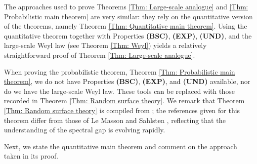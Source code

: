 \documentclass[11pt,twoside,reqno]{amsart} \usepackage{a4wide} \usepackage[T1]{fontenc} \usepackage[utf8]{inputenc} \usepackage{soul}  \usepackage{amsmath} \usepackage{amsfonts} \usepackage{amssymb} \usepackage{mathtools} \usepackage{amsthm} \usepackage{xcolor} \usepackage{graphicx} \usepackage{hyperref} \usepackage{standalone} \usepackage{esint} \usepackage{comment} \usepackage[left=2.3cm,top=3cm,right=2.3cm]{geometry} \usepackage{bm} \usepackage{svg} \usepackage{float} \numberwithin{equation}{section} \theoremstyle{plain} \newtheorem{thm}{Theorem}[section] \newtheorem{theorem}[thm]{Theorem} \newtheorem*{theorem*}{Theorem}\newtheorem{conj}[thm]{Conjecture} \newtheorem{lemma}[thm]{Lemma} \newtheorem{prop}[thm]{Proposition} \newtheorem{proposition}[thm]{Proposition} \newtheorem{cor}[thm]{Corollary} \newtheorem{question}[thm]{Question} \newtheorem{corollary}[thm]{Corollary} \newtheorem{assumption}[thm]{Assumption} \theoremstyle{definition} \newtheorem{defn}[thm]{Definition} \newtheorem{choice}[thm]{Choice} \newtheorem{definition}[thm]{Definition} \newtheorem{ex}[thm]{Example} \newtheorem{notation}[thm]{Notation} \newtheorem*{ack}{Acknowledgements} \theoremstyle{remark} \newtheorem{remark}[thm]{Remark} \newtheorem{bigremark}[thm]{Remark} \usepackage{xcolor} \newcommand{\red}[1]{ {\color{Red}#1} } \newcommand{\blue}[1]{ {\color{Blue}#1} } \author{Kai Hippi} \address{Aalto University, Espoo, Finland} \email{kai.hippi@aalto.fi}
\begin{document}
The approaches used to prove Theorems \ref{Thm: Large-scale analogue} and \ref{Thm: Probabilistic main theorem} are very similar: they rely on the quantitative version of the theorems, namely Theorem \ref{Thm: Quantitative main theorem}. Using the quantitative theorem together with Properties \textbf{(BSC)}, \textbf{(EXP)}, \textbf{(UND)}, and the large-scale Weyl law (see Theorem \ref{Thm: Weyl}) yields a relatively straightforward proof of Theorem \ref{Thm: Large-scale analogue}. 

When proving the probabilistic theorem, Theorem \ref{Thm: Probabilistic main theorem}, we do not have Properties \textbf{(BSC)}, \textbf{(EXP)}, and \textbf{(UND)} available, nor do we have the large-scale Weyl law. These tools can be replaced with those recorded in Theorem \ref{Thm: Random surface theory}. We remark that Theorem \ref{Thm: Random surface theory} is compiled from \cite[Thm. 1.7, 1.9]{LS24}; the references given for this theorem differ from those of Le Masson and Sahlsten \cite{LS24}, reflecting that the understanding of the spectral gap is evolving rapidly.

Next, we state the quantitative main theorem and comment on the approach taken in its proof.
\end{document}

